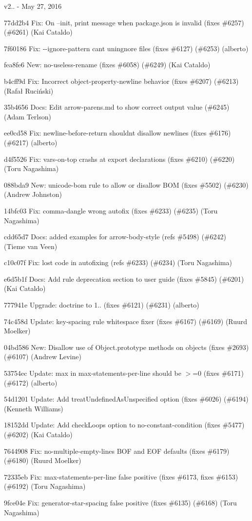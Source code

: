 v2.. -\/ May 27, 2016


\begin{DoxyItemize}
\item 77dd2b4 Fix\+: On --init, print message when package.\+json is invalid (fixes \#6257) (\#6261) (Kai Cataldo)
\item 7f60186 Fix\+: {\ttfamily -\/-\/ignore-\/pattern} can\textquotesingle{}t uningnore files (fixes \#6127) (\#6253) (alberto)
\item fea8fe6 New\+: no-\/useless-\/rename (fixes \#6058) (\#6249) (Kai Cataldo)
\item b4cff9d Fix\+: Incorrect object-\/property-\/newline behavior (fixes \#6207) (\#6213) (Rafał Ruciński)
\item 35b4656 Docs\+: Edit arrow-\/parens.\+md to show correct output value (\#6245) (Adam Terlson)
\item ee0cd58 Fix\+: {\ttfamily newline-\/before-\/return} shouldn\textquotesingle{}t disallow newlines (fixes \#6176) (\#6217) (alberto)
\item d4f5526 Fix\+: {\ttfamily vars-\/on-\/top} crashs at export declarations (fixes \#6210) (\#6220) (Toru Nagashima)
\item 088bda9 New\+: {\ttfamily unicode-\/bom} rule to allow or disallow B\+OM (fixes \#5502) (\#6230) (Andrew Johnston)
\item 14bfc03 Fix\+: {\ttfamily comma-\/dangle} wrong autofix (fixes \#6233) (\#6235) (Toru Nagashima)
\item cdd65d7 Docs\+: added examples for arrow-\/body-\/style (refs \#5498) (\#6242) (Tieme van Veen)
\item c10c07f Fix\+: lost code in autofixing (refs \#6233) (\#6234) (Toru Nagashima)
\item e6d5b1f Docs\+: Add rule deprecation section to user guide (fixes \#5845) (\#6201) (Kai Cataldo)
\item 777941e Upgrade\+: doctrine to 1.. (fixes \#6121) (\#6231) (alberto)
\item 74c458d Update\+: key-\/spacing rule whitespace fixer (fixes \#6167) (\#6169) (Ruurd Moelker)
\item 04bd586 New\+: Disallow use of Object.\+prototype methods on objects (fixes \#2693) (\#6107) (Andrew Levine)
\item 53754ec Update\+: max in {\ttfamily max-\/statements-\/per-\/line} should be $>$=0 (fixes \#6171) (\#6172) (alberto)
\item 54d1201 Update\+: Add treat\+Undefined\+As\+Unspecified option (fixes \#6026) (\#6194) (Kenneth Williams)
\item 18152dd Update\+: Add check\+Loops option to no-\/constant-\/condition (fixes \#5477) (\#6202) (Kai Cataldo)
\item 7644908 Fix\+: no-\/multiple-\/empty-\/lines B\+OF and E\+OF defaults (fixes \#6179) (\#6180) (Ruurd Moelker)
\item 72335eb Fix\+: {\ttfamily max-\/statements-\/per-\/line} false positive (fixes \#6173, fixes \#6153) (\#6192) (Toru Nagashima)
\item 9fce04e Fix\+: {\ttfamily generator-\/star-\/spacing} false positive (fixes \#6135) (\#6168) (Toru Nagashima)
\end{DoxyItemize}


